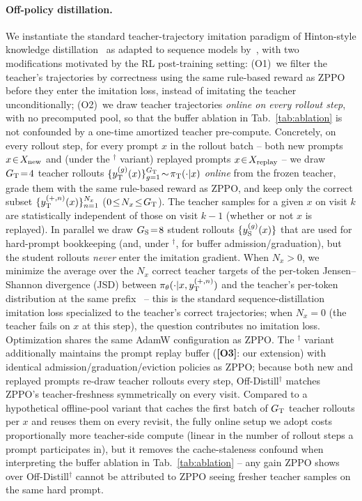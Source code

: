 \paragraph{Off-policy distillation.}
We instantiate the standard teacher-trajectory imitation paradigm of Hinton-style knowledge distillation~\citep{hinton2015distilling} as adapted to sequence models by~\citet{sanh2019distilbert}, with two modifications motivated by the RL post-training setting: (O1)~we filter the teacher's trajectories by correctness using the same rule-based reward as ZPPO before they enter the imitation loss, instead of imitating the teacher unconditionally; (O2)~we draw teacher trajectories \emph{online on every rollout step}, with no precomputed pool, so that the buffer ablation in Tab.~\ref{tab:ablation} is not confounded by a one-time amortized teacher pre-compute. Concretely, on every rollout step, for every prompt $x$ in the rollout batch -- both new prompts $x\!\in\!X_{\rm new}$ and (under the $^{\dagger}$ variant) replayed prompts $x\!\in\!X_{\rm replay}$ -- we draw $G_{\rm T}\!=\!4$ teacher rollouts $\{y_{\rm T}^{(g)}(x)\}_{g=1}^{G_{\rm T}}\!\sim\!\pi_{\rm T}(\cdot|x)$ \emph{online} from the frozen teacher, grade them with the same rule-based reward as ZPPO, and keep only the correct subset $\{y_{\rm T}^{(+,n)}(x)\}_{n=1}^{N_x}$ ($0\!\leq\!N_x\!\leq\!G_{\rm T}$). The teacher samples for a given $x$ on visit $k$ are statistically independent of those on visit $k\!-\!1$ (whether or not $x$ is replayed). In parallel we draw $G_{\rm S}\!=\!8$ student rollouts $\{y_{\rm S}^{(g)}(x)\}$ that are used for hard-prompt bookkeeping (and, under $^{\dagger}$, for buffer admission/graduation), but the student rollouts \emph{never} enter the imitation gradient. When $N_x\!>\!0$, we minimize the average over the $N_x$ correct teacher targets of the per-token Jensen--Shannon divergence (JSD) between $\pi_\theta(\cdot|x, y_{\rm T}^{(+,n)})$ and the teacher's per-token distribution at the same prefix~\citep{hinton2015distilling,sanh2019distilbert,ko2024distillm} -- this is the standard sequence-distillation imitation loss specialized to the teacher's correct trajectories; when $N_x\!=\!0$ (the teacher fails on $x$ at this step), the question contributes no imitation loss. Optimization shares the same AdamW configuration as ZPPO. The $^{\dagger}$ variant additionally maintains the prompt replay buffer (\textbf{[O3]}: our extension) with identical admission/graduation/eviction policies as ZPPO; because both new and replayed prompts re-draw teacher rollouts every step, Off-Distill$^{\dagger}$ matches ZPPO's teacher-freshness symmetrically on every visit. Compared to a hypothetical offline-pool variant that caches the first batch of $G_{\rm T}$ teacher rollouts per $x$ and reuses them on every revisit, the fully online setup we adopt costs proportionally more teacher-side compute (linear in the number of rollout steps a prompt participates in), but it removes the cache-staleness confound when interpreting the buffer ablation in Tab.~\ref{tab:ablation} -- any gain ZPPO shows over Off-Distill$^{\dagger}$ cannot be attributed to ZPPO seeing fresher teacher samples on the same hard prompt.

